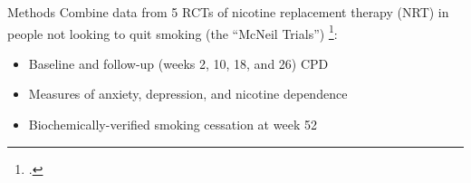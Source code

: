 \documentclass[aspectratio=169]{beamer}
\begin{document}
\begin{frame}{Methods}
	Combine data from 5 RCTs of nicotine replacement therapy (NRT) in people not looking to quit smoking (the ``McNeil Trials'') \footcite{wennikeSmokingReductionPromotes2003,rennardEfficacyNicotineInhaler2006,bolligerSmokingReductionOral2000,batraSmokingReductionTreatment2005,hausteinDoubleblindRandomizedPlacebocontrolled2001}:
	
	\begin{itemize}
		\item<1-> Baseline and follow-up (weeks 2, 10, 18, and 26) CPD
		\item<2-> Measures of anxiety, depression, and nicotine dependence
		\item<3-> Biochemically-verified smoking cessation at week 52
	\end{itemize}	
	

\end{frame}
\end{document}
